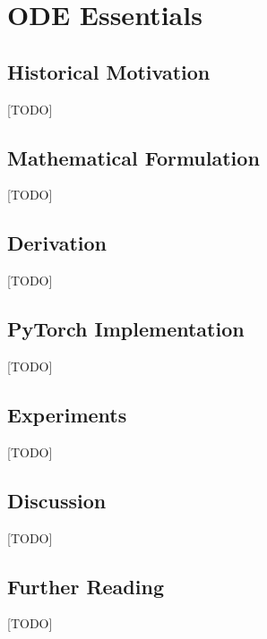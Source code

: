 
\chapter{ODE Essentials}
\label{ch:01_ode_essentials}


\section{Historical Motivation}
[TODO]

\section{Mathematical Formulation}
[TODO]

\section{Derivation}
[TODO]

\section{PyTorch Implementation}
[TODO]

\section{Experiments}
[TODO]

\section{Discussion}
[TODO]

\section{Further Reading}
[TODO]
